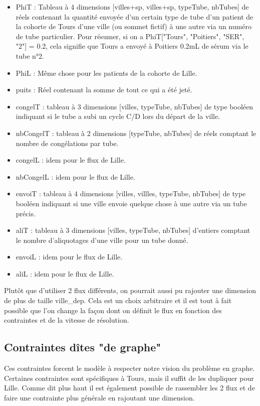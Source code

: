\documentclass{polytech/polytech}
\numberwithin{figure}{chapter}
\begin{document}
\begin{itemize}
	\item PhiT : Tableau à 4 dimensions [villes+sp, villes+sp, typeTube, nbTubes] de réels contenant la quantité envoyée d'un certain type de tube d'un patient de la cohorte de Tours d'une ville (ou sommet fictif) à une autre via un numéro de tube particulier.
Pour résumer, si on a PhiT["Tours", "Poitiers", "SER", "2"] = 0.2, cela signifie que Tours a envoyé à Poitiers 0.2mL de sérum via le tube n°2.
	\item PhiL : Même chose pour les patients de la cohorte de Lille.
	\item puits : Réel contenant la somme de tout ce qui a été jeté.
	\item congelT : tableau à 3 dimensions [villes, typeTube, nbTubes] de type booléen indiquant si le tube a subi un cycle C/D lors du départ de la ville.
	\item nbCongelT : tableau à 2 dimensions [typeTube, nbTubes] de réels comptant le nombre de congélations par tube.
	\item congelL : idem pour le flux de Lille.
	\item nbCongelL : idem pour le flux de Lille.
	\item envoiT : tableau à 4 dimensions [villes, villles, typeTube, nbTubes] de type booléen indiquant si une ville envoie quelque chose à une autre via un tube précis.
	\item aliT : tableau à 3 dimensions [villes, typeTube, nbTubes] d'entiers comptant le nombre d'aliquotages d'une ville pour un tube donné.
	\item envoiL : idem pour le flux de Lille.
	\item aliL : idem pour le flux de Lille.\\
\end{itemize}

Plutôt que d'utiliser 2 flux différents, on pourrait aussi pu rajouter une dimension de plus de taille ville\_dep. Cela est un choix arbitraire et il est tout à fait possible que l'on change la façon dont on définit le flux en fonction des contraintes et de la vitesse de résolution.

\subsection{Contraintes dîtes "de graphe"}

Ces contraintes forcent le modèle à respecter notre vision du problème en graphe. Certaines contraintes sont spécifiques à Tours, mais il suffit de les dupliquer pour Lille. Comme dit plus haut il est également possible de rassembler les 2 flux et de faire une contrainte plus générale en rajoutant une dimension.
\end{document}
